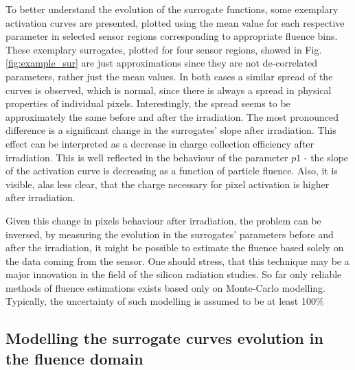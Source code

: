 To better understand the evolution of the surrogate functions, some exemplary activation curves are presented, plotted using the mean value for each respective parameter in selected sensor regions corresponding to appropriate fluence bins.
These exemplary surrogates, plotted for four sensor regions, showed in Fig. \ref{fig:example_sur} are just approximations since they are not de-correlated parameters, rather just the mean values.
In both cases a similar spread of the curves is observed, which is normal, since there is always a spread in physical properties of individual pixels. Interestingly, the spread seems to be approximately the same before and after the irradiation. The most pronounced difference is a significant change in the surrogates' slope after irradiation. This effect can be interpreted as a decrease in charge collection efficiency after irradiation. This is well reflected in the behaviour of the parameter $p1$ - the slope of the activation curve is decreasing as a function of particle fluence. Also, it is visible, alas less clear, that the charge necessary for pixel activation is higher after irradiation. 

Given this change in pixels behaviour after irradiation, the problem can be inversed, by measuring the evolution in the surrogates' parameters before and after the irradiation, it might be possible to estimate the fluence based solely on the data coming from the sensor. One should stress, that this technique may be a major innovation in the field of the silicon radiation studies. So far only reliable methods of fluence estimations exists based only on Monte-Carlo modelling. Typically, the uncertainty of such modelling is assumed to be at least 100$\%$

\subsection{Modelling the surrogate curves evolution in the fluence domain}

